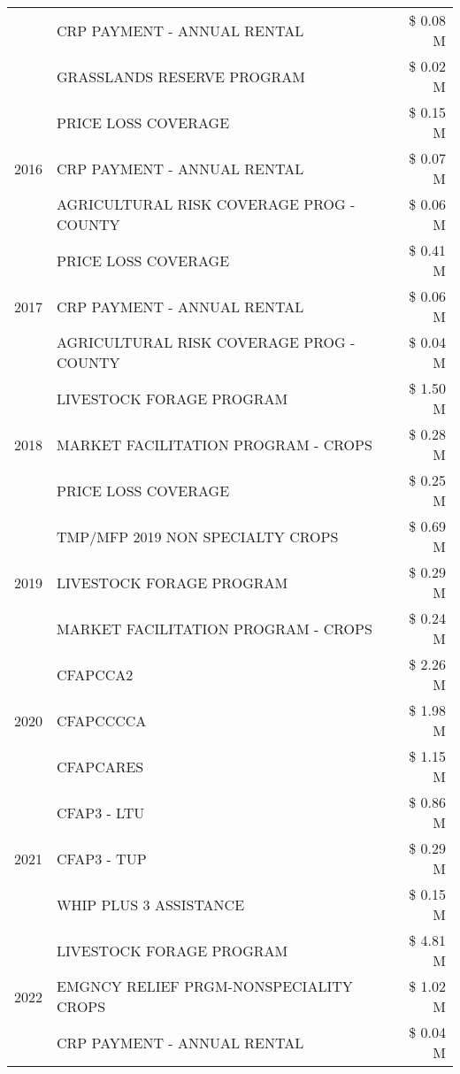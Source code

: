 \begin{tabular}{llr}
 & CRP PAYMENT - ANNUAL RENTAL & \$ 0.08 M \\
 & GRASSLANDS RESERVE PROGRAM & \$ 0.02 M \\
\cline{1-3}
\multirow[t]{3}{*}{2016} & PRICE LOSS COVERAGE & \$ 0.15 M \\
 & CRP PAYMENT - ANNUAL RENTAL & \$ 0.07 M \\
 & AGRICULTURAL RISK COVERAGE PROG - COUNTY & \$ 0.06 M \\
\cline{1-3}
\multirow[t]{3}{*}{2017} & PRICE LOSS COVERAGE & \$ 0.41 M \\
 & CRP PAYMENT - ANNUAL RENTAL & \$ 0.06 M \\
 & AGRICULTURAL RISK COVERAGE PROG - COUNTY & \$ 0.04 M \\
\cline{1-3}
\multirow[t]{3}{*}{2018} & LIVESTOCK FORAGE PROGRAM & \$ 1.50 M \\
 & MARKET FACILITATION PROGRAM - CROPS & \$ 0.28 M \\
 & PRICE LOSS COVERAGE & \$ 0.25 M \\
\cline{1-3}
\multirow[t]{3}{*}{2019} & TMP/MFP 2019 NON SPECIALTY CROPS & \$ 0.69 M \\
 & LIVESTOCK FORAGE PROGRAM & \$ 0.29 M \\
 & MARKET FACILITATION PROGRAM - CROPS & \$ 0.24 M \\
\cline{1-3}
\multirow[t]{3}{*}{2020} & CFAPCCA2 & \$ 2.26 M \\
 & CFAPCCCCA & \$ 1.98 M \\
 & CFAPCARES & \$ 1.15 M \\
\cline{1-3}
\multirow[t]{3}{*}{2021} & CFAP3 - LTU & \$ 0.86 M \\
 & CFAP3 - TUP & \$ 0.29 M \\
 & WHIP PLUS 3 ASSISTANCE & \$ 0.15 M \\
\cline{1-3}
\multirow[t]{3}{*}{2022} & LIVESTOCK FORAGE PROGRAM & \$ 4.81 M \\
 & EMGNCY RELIEF PRGM-NONSPECIALITY CROPS & \$ 1.02 M \\
 & CRP PAYMENT - ANNUAL RENTAL & \$ 0.04 M \\
\cline{1-3}
\bottomrule
\end{tabular}
